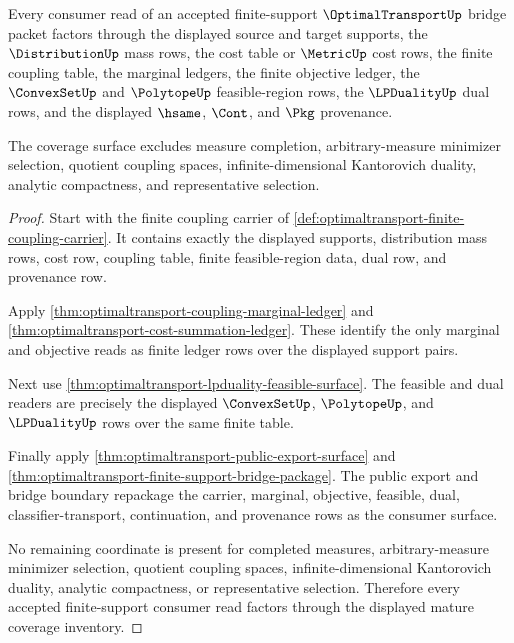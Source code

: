 \begin{theorem}
\label{thm:optimaltransport-mature-finite-support-coverage}
Every consumer read of an accepted finite-support $\OptimalTransportUp$ bridge
packet factors through the displayed source and target supports, the
$\DistributionUp$ mass rows, the cost table or $\MetricUp$ cost rows, the
finite coupling table, the marginal ledgers, the finite objective ledger, the
$\ConvexSetUp$ and $\PolytopeUp$ feasible-region rows, the $\LPDualityUp$ dual
rows, and the displayed $\hsame$, $\Cont$, and $\Pkg$ provenance.

The coverage surface excludes measure completion, arbitrary-measure minimizer
selection, quotient coupling spaces, infinite-dimensional Kantorovich duality,
analytic compactness, and representative selection.
\end{theorem}
\begin{proof}
Start with the finite coupling carrier of
\autoref{def:optimaltransport-finite-coupling-carrier}. It contains exactly
the displayed supports, distribution mass rows, cost row, coupling table,
finite feasible-region data, dual row, and provenance row.

Apply \autoref{thm:optimaltransport-coupling-marginal-ledger} and
\autoref{thm:optimaltransport-cost-summation-ledger}. These identify the
only marginal and objective reads as finite ledger rows over the displayed
support pairs.

Next use \autoref{thm:optimaltransport-lpduality-feasible-surface}. The
feasible and dual readers are precisely the displayed $\ConvexSetUp$,
$\PolytopeUp$, and $\LPDualityUp$ rows over the same finite table.

Finally apply \autoref{thm:optimaltransport-public-export-surface} and
\autoref{thm:optimaltransport-finite-support-bridge-package}. The public
export and bridge boundary repackage the carrier, marginal, objective,
feasible, dual, classifier-transport, continuation, and provenance rows as the
consumer surface.

No remaining coordinate is present for completed measures, arbitrary-measure
minimizer selection, quotient coupling spaces, infinite-dimensional
Kantorovich duality, analytic compactness, or representative selection.
Therefore every accepted finite-support consumer read factors through the
displayed mature coverage inventory.
\end{proof}

